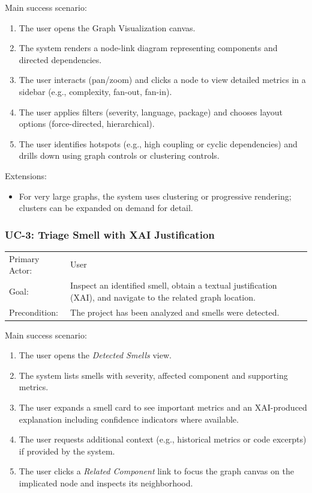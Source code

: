 Main success scenario:
\begin{enumerate}
    \item The user opens the Graph Visualization canvas.
    \item The system renders a node-link diagram representing components and directed dependencies.
    \item The user interacts (pan/zoom) and clicks a node to view detailed metrics in a sidebar (e.g., complexity, fan-out, fan-in).
    \item The user applies filters (severity, language, package) and chooses layout options (force-directed, hierarchical).
    \item The user identifies hotspots (e.g., high coupling or cyclic dependencies) and drills down using graph controls or clustering controls.
\end{enumerate}

Extensions:
\begin{itemize}
    \item For very large graphs, the system uses clustering or progressive rendering; clusters can be expanded on demand for detail.
\end{itemize}

\subsubsection{UC-3: Triage Smell with XAI Justification}
\label{subsubsection:uc-3}
\begin{tabularx}{\textwidth}{@{}p{3.2cm}X@{}}
Primary Actor: & User \\
Goal: & Inspect an identified smell, obtain a textual justification (XAI), and navigate to the related graph location. \\
Precondition: & The project has been analyzed and smells were detected. \\
\end{tabularx}

Main success scenario:
\begin{enumerate}
    \item The user opens the \textit{Detected Smells} view.
    \item The system lists smells with severity, affected component and supporting metrics.
    \item The user expands a smell card to see important metrics and an XAI-produced explanation including confidence indicators where available.
    \item The user requests additional context (e.g., historical metrics or code excerpts) if provided by the system.
    \item The user clicks a \textit{Related Component} link to focus the graph canvas on the implicated node and inspects its neighborhood.
\end{enumerate}

